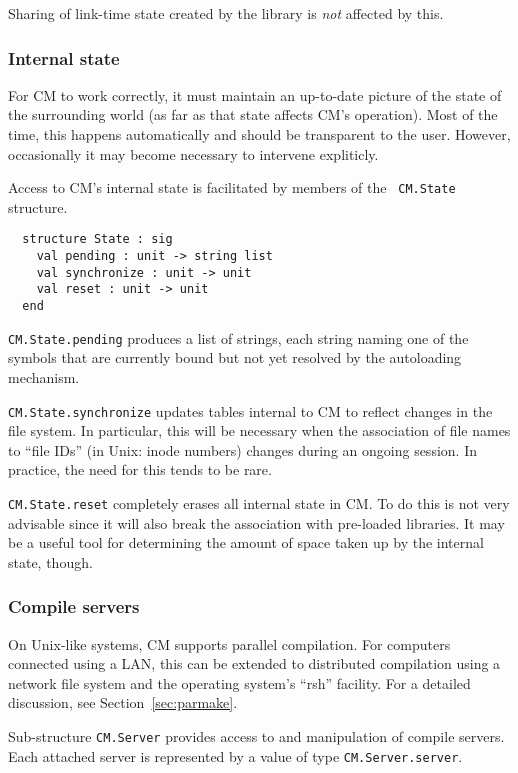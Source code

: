 \documentclass{article}
\begin{document}
Sharing of link-time state created by the library is {\em not}
affected by this.

\subsubsection*{Internal state}

For CM to work correctly, it must maintain an up-to-date picture of
the state of the surrounding world (as far as that state affects CM's
operation).  Most of the time, this happens automatically and should be
transparent to the user.  However, occasionally it may become
necessary to intervene expliticly.

Access to CM's internal state is facilitated by members of the {\tt
CM.State} structure.

\begin{verbatim}
  structure State : sig
    val pending : unit -> string list
    val synchronize : unit -> unit
    val reset : unit -> unit
  end
\end{verbatim}

{\tt CM.State.pending} produces a list of strings, each string naming
one of the symbols that are currently bound but not yet resolved by
the autoloading mechanism.

{\tt CM.State.synchronize} updates tables internal to CM to reflect
changes in the file system.  In particular, this will be necessary
when the association of file names to ``file IDs'' (in Unix: inode
numbers) changes during an ongoing session.  In practice, the need for
this tends to be rare.

{\tt CM.State.reset} completely erases all internal state in CM.  To
do this is not very advisable since it will also break the association
with pre-loaded libraries.  It may be a useful tool for determining
the amount of space taken up by the internal state, though.

\subsubsection*{Compile servers}

On Unix-like systems, CM supports parallel compilation.  For computers
connected using a LAN, this can be extended to distributed compilation
using a network file system and the operating system's ``rsh''
facility.  For a detailed discussion, see Section~\ref{sec:parmake}.

Sub-structure {\tt CM.Server} provides access to and manipulation of
compile servers.  Each attached server is represented by a value of
type {\tt CM.Server.server}.
\end{document}
